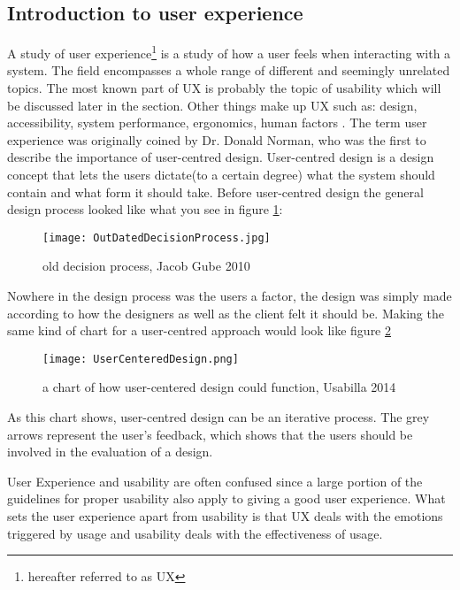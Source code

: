 \subsection{Introduction to user experience }\label{UXIntro}
A study of user experience\footnote{hereafter referred to as UX} is a study of how a user feels when interacting with a system. The field encompasses a whole range of different and seemingly unrelated topics. The most known part of UX is probably the topic of usability which will be discussed later in the section. Other things make up UX such as: design, accessibility, system performance, ergonomics, human factors \cite{UXIntro}. The term user 
experience  was originally coined by Dr. Donald Norman, who was the first to describe the importance of user-centred design. User-centred design is a design 
concept that lets the users dictate(to a certain degree) what the system should contain and what form it should take. Before user-centred design the general design process looked like what you see in figure \ref{UXDesignOutdated}:
\begin{figure}[H]
\centering
\texttt{[image: OutDatedDecisionProcess.jpg]}
\caption{old decision process, Jacob Gube 2010}
\label{UXDesignOutdated}
\end{figure}
Nowhere in the design process was the users a factor, the design was simply made according to how the designers as well as the client felt it should be. Making the same kind of chart for a user-centred approach would look like figure \ref{UXUserCentred}\\
\begin{figure}[H]
\centering
\texttt{[image: UserCenteredDesign.png]}
\caption{a chart of how user-centered design could function, Usabilla 2014}
\label{UXUserCentred}
\end{figure}
As this chart shows, user-centred design can be an iterative process. The grey arrows represent the user's feedback, which shows that the users should be involved 
in the evaluation of a design.

User Experience and usability are often confused since a large portion of the guidelines for proper usability also apply to giving a good user experience. 
What sets the user experience apart from usability is that UX deals with the emotions triggered by usage and usability deals with the effectiveness of usage.

